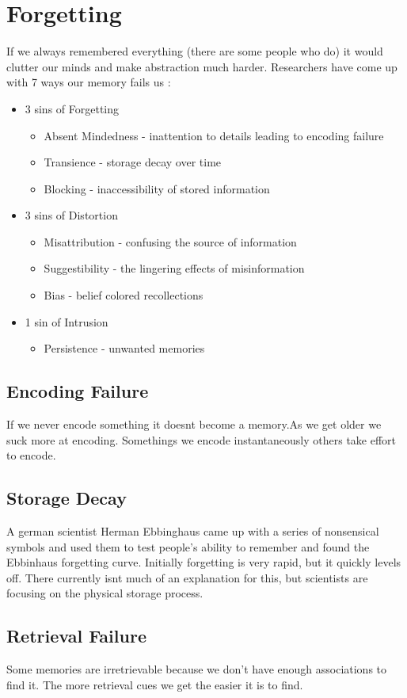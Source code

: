 \documentclass[12pt]{article}
\begin{document}
\section*{Forgetting}
If we always remembered everything (there are some people who do) it would clutter our minds and make abstraction much harder. Researchers have come up with 7 ways our memory fails us :
\begin{itemize}
\item 3 sins of Forgetting
\begin{itemize}
\item Absent Mindedness - inattention to details leading to encoding failure
\item Transience - storage decay over time
\item Blocking - inaccessibility of stored information
\end{itemize}
\item 3 sins of Distortion
\begin{itemize}
\item Misattribution - confusing the source of information
\item Suggestibility - the lingering effects of misinformation
\item Bias - belief colored recollections
\end{itemize}
\item 1 sin of Intrusion
\begin{itemize}
\item Persistence - unwanted memories
\end{itemize}
\end{itemize}
\subsection*{Encoding Failure} If we never encode something it doesnt become a memory.As we get older we suck more at encoding. Somethings we encode instantaneously others take effort to encode.
\subsection*{Storage Decay} A german scientist Herman Ebbinghaus came up with a series of nonsensical symbols and used them to test people's ability to remember and found the Ebbinhaus forgetting curve. Initially forgetting is very rapid, but it quickly levels off. There currently isnt much of an explanation for this, but scientists are focusing on the physical storage process.
\subsection*{Retrieval Failure} Some memories are irretrievable because we don’t have enough associations to find it. The more retrieval cues we get the easier it is to find. 
\end{document}
